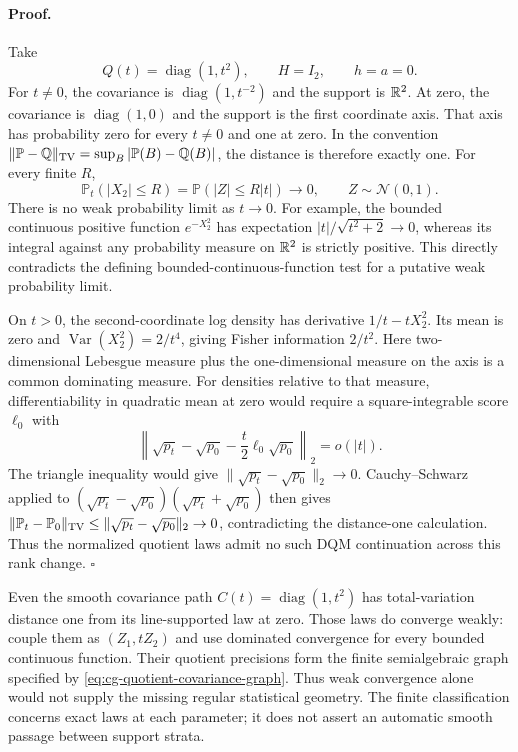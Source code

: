 \paragraph{Proof.}
Take
\begin{equation}
Q(t)=\operatorname{diag}(1,t^2),\qquad
H=I_2,\qquad h=a=0.
\label{eq:cg-rank-change-example}
\end{equation}
For \(t\ne0\), the covariance is
\(\operatorname{diag}(1,t^{-2})\) and the support
is \(\mathbb R^2\). At zero, the covariance is
\(\operatorname{diag}(1,0)\) and the support is the
first coordinate axis. That axis has probability
zero for every \(t\ne0\) and one at zero.
In the convention
\(\|\mathbb P-\mathbb Q\|_{\rm TV}
=\sup_B|\mathbb P(B)-\mathbb Q(B)|\),
the distance is therefore exactly one.
For every finite \(R\),
\begin{equation}
\mathbb P_t(|X_2|\leq R)
=\mathbb P(|Z|\leq R|t|)\longrightarrow0,
\qquad Z\sim\mathcal N(0,1).
\label{eq:cg-rank-change-escape}
\end{equation}
There is no weak probability limit as \(t\to0\).
For example, the bounded continuous positive
function \(e^{-X_2^2}\) has expectation
\(|t|/\sqrt{t^2+2}\to0\), whereas its integral
against any probability measure on \(\mathbb R^2\)
is strictly positive. This directly contradicts
the defining bounded-continuous-function test for
a putative weak probability limit.

On \(t>0\), the second-coordinate log density has
derivative \(1/t-tX_2^2\). Its mean is zero and
\(\operatorname{Var}(X_2^2)=2/t^4\), giving Fisher
information \(2/t^2\). Here two-dimensional
Lebesgue measure plus the one-dimensional measure
on the axis is a common dominating measure.
For densities relative to that measure, differentiability
in quadratic mean at zero would require a
square-integrable score \(\ell_0\) with
\[
\left\|\sqrt{p_t}-\sqrt{p_0}
-\frac{t}{2}\ell_0\sqrt{p_0}\right\|_2=o(|t|).
\]
The triangle inequality would give
\(\|\sqrt{p_t}-\sqrt{p_0}\|_2\to0\).
Cauchy--Schwarz applied to
\((\sqrt{p_t}-\sqrt{p_0})(\sqrt{p_t}+\sqrt{p_0})\)
then gives
\(\|\mathbb P_t-\mathbb P_0\|_{\rm TV}
\leq\|\sqrt{p_t}-\sqrt{p_0}\|_2\to0\),
contradicting the distance-one calculation.
Thus the normalized quotient laws admit no such
DQM continuation across this rank change.
\(\square\)

Even the smooth covariance path
\(C(t)=\operatorname{diag}(1,t^2)\) has total-variation
distance one from its line-supported law at zero.
Those laws do converge weakly: couple them as
\((Z_1,tZ_2)\) and use dominated convergence for
every bounded continuous function. Their quotient
precisions form the finite semialgebraic graph
specified by \eqref{eq:cg-quotient-covariance-graph}.
Thus weak convergence alone would not supply the
missing regular statistical geometry. The finite
classification concerns exact laws at each
parameter; it does not assert an automatic
smooth passage between support strata.

